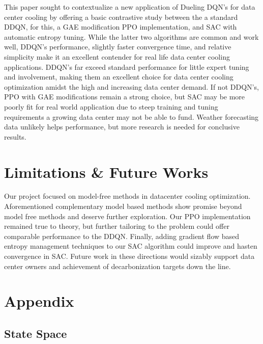 \documentclass[12pt]{article}
\begin{document}
This paper sought to contextualize a new application of Dueling DQN's for data center cooling by offering a basic contrastive study between the a standard DDQN, for this, a GAE modification PPO implementation, and SAC with automatic entropy tuning. While the latter two algorithms are common and work well, DDQN's performance, slightly faster convergence time, and relative simplicity make it an excellent contender for real life data center cooling applications. DDQN's far exceed standard performance for little expert tuning and involvement, making them an excellent choice for data center cooling optimization amidst the high and increasing data center demand. If not DDQN's, PPO with GAE modifications remain a strong choice, but SAC may be more poorly fit for real world application due to steep training and tuning requirements a growing data center may not be able to fund. Weather forecasting data unlikely helps performance, but more research is needed for conclusive results.


\section{Limitations \& Future Works}

Our project focused on model-free methods in datacenter cooling optimization. Aforementioned complementary model based methods show promise beyond model free methods and deserve further exploration. Our PPO implementation remained true to theory, but further tailoring to the problem could offer comparable performance to the DDQN. Finally, adding gradient flow based entropy management techniques to our SAC algorithm could improve and hasten convergence in SAC. Future work in these directions would sizably support data center owners and achievement of decarbonization targets down the line.


\section{Appendix}

\subsection{State Space}\label{App:ss}
\end{document}
